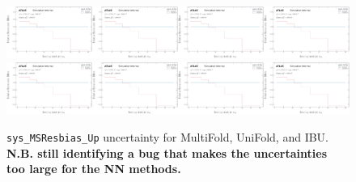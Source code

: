 \begin{figure}[h!]
\includegraphics[width=0.25\textwidth,page=133]{figures/SimResults/Lepton_SystEffect.pdf}\includegraphics[width=0.25\textwidth,page=141]{figures/SimResults/Lepton_SystEffect.pdf}\includegraphics[width=0.25\textwidth,page=149]{figures/SimResults/Lepton_SystEffect.pdf}\includegraphics[width=0.25\textwidth,page=157]{figures/SimResults/Lepton_SystEffect.pdf}\\
\includegraphics[width=0.25\textwidth,page=165]{figures/SimResults/Lepton_SystEffect.pdf}\includegraphics[width=0.25\textwidth,page=173]{figures/SimResults/Lepton_SystEffect.pdf}\includegraphics[width=0.25\textwidth,page=181]{figures/SimResults/Lepton_SystEffect.pdf}\includegraphics[width=0.25\textwidth,page=189]{figures/SimResults/Lepton_SystEffect.pdf}
\caption{\texttt{sys\_MSResbias\_Up} uncertainty for MultiFold, UniFold, and IBU.  \textbf{N.B. still identifying a bug that makes the uncertainties too large for the NN methods.}}
\label{fig:simresultsmulti_Leptonuncertsl5}
\end{figure}

